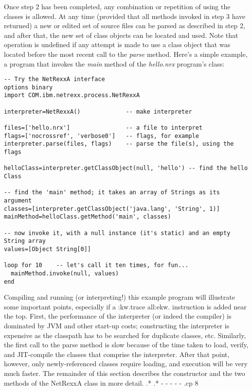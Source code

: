 Once step 2 has been completed, any combination or repetition of using
the classes is allowed.  At any time (provided that all methods invoked
in step 3 have returned) a new or edited set of source files can be
parsed as described in step 2, and after that, the new set of class
objects can be located and used.  Note that operation is undefined if
any attempt is made to use a class object that was located before the
most recent call to the \emph{parse} method.
\newline
Here's a simple example, a program that invokes the \emph{main} method
of the \emph{hello.nrx} program's class:
\begin{verbatim}
-- Try the NetRexxA interface
options binary
import COM.ibm.netrexx.process.NetRexxA

interpreter=NetRexxA()             -- make interpreter

files=['hello.nrx']                -- a file to interpret
flags=['nocrossref', 'verbose0']   -- flags, for example
interpreter.parse(files, flags)    -- parse the file(s), using the flags

helloClass=interpreter.getClassObject(null, 'hello') -- find the hello Class

-- find the 'main' method; it takes an array of Strings as its argument
classes=[interpreter.getClassObject('java.lang', 'String', 1)]
mainMethod=helloClass.getMethod('main', classes)

-- now invoke it, with a null instance (it's static) and an empty String array
values=[Object String[0]]

loop for 10    -- let's call it ten times, for fun...
  mainMethod.invoke(null, values)
end
\end{verbatim}

Compiling and running (or interpreting!) this example program will
illustrate some important points, especially if a :kw.trace all:ekw.
instruction is added near the top.  First, the performance of the
interpreter (or indeed the compiler) is dominated by JVM and other
start-up costs; constructing the interpreter is expensive as the
classpath has to be searched for duplicate classes, etc.  Similarly,
the first call to the parse method is slow because of the time taken to
load, verify, and JIT-compile the classes that comprise the interpreter.
After that point, however, only newly-referenced classes require
loading, and execution will be very much faster.
\newline
The remainder of this section describes the constructor and the two
methods of the NetRexxA class in more detail.
.*
.* - - - - -
.cp 8
